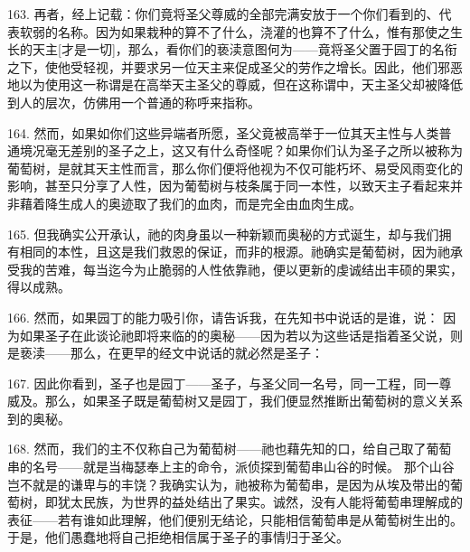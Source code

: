 163. 再者，经上记载：你们竟将圣父尊威的全部完满安放于一个你们看到的、代表软弱的名称。因为如果栽种的算不了什么，浇灌的也算不了什么，惟有那使之生长的天主[才是一切]，那么，看你们的亵渎意图何为——竟将圣父置于园丁的名衔之下，使他受轻视，并要求另一位天主来促成圣父的劳作之增长。因此，他们邪恶地以为使用这一称谓是在高举天主圣父的尊威，但在这称谓中，天主圣父却被降低到人的层次，仿佛用一个普通的称呼来指称。\par

164. 然而，如果如你们这些异端者所愿，圣父竟被高举于一位其天主性与人类普通境况毫无差别的圣子之上，这又有什么奇怪呢？如果你们认为圣子之所以被称为葡萄树，是就其天主性而言，那么你们便将他视为不仅可能朽坏、易受风雨变化的影响，甚至只分享了人性，因为葡萄树与枝条属于同一本性，以致天主子看起来并非藉着降生成人的奥迹取了我们的血肉，而是完全由血肉生成。\par

165. 但我确实公开承认，祂的肉身虽以一种新颖而奥秘的方式诞生，却与我们拥有相同的本性，且这是我们救恩的保证，而非的根源。祂确实是葡萄树，因为祂承受我的苦难，每当迄今为止脆弱的人性依靠祂，便以更新的虔诚结出丰硕的果实，得以成熟。\par

166. 然而，如果园丁的能力吸引你，请告诉我，在先知书中说话的是谁，说： 因为如果圣子在此谈论祂即将来临的的奥秘——因为若以为这些话是指着圣父说，则是亵渎——那么，在更早的经文中说话的就必然是圣子：\par

167. 因此你看到，圣子也是园丁——圣子，与圣父同一名号，同一工程，同一尊威及。那么，如果圣子既是葡萄树又是园丁，我们便显然推断出葡萄树的意义关系到的奥秘。\par

168. 然而，我们的主不仅称自己为葡萄树——祂也藉先知的口，给自己取了葡萄串的名号——就是当梅瑟奉上主的命令，派侦探到葡萄串山谷的时候。 那个山谷岂不就是的谦卑与的丰饶？我确实认为，祂被称为葡萄串，是因为从埃及带出的葡萄树，即犹太民族，为世界的益处结出了果实。诚然，没有人能将葡萄串理解成的表征——若有谁如此理解，他们便别无结论，只能相信葡萄串是从葡萄树生出的。于是，他们愚蠢地将自己拒绝相信属于圣子的事情归于圣父。\par

